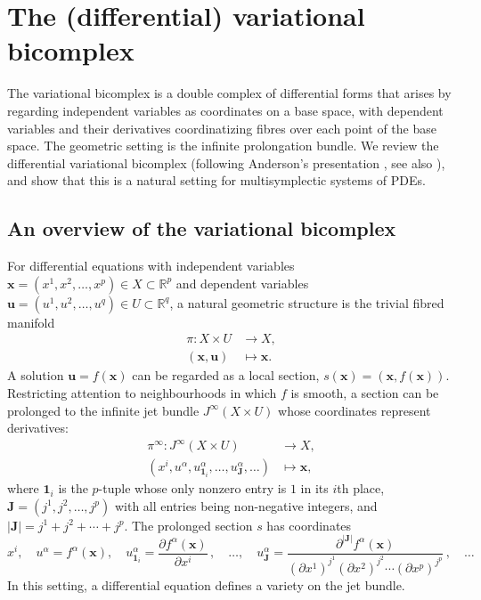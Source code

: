 \documentclass[11pt]{article} %
\numberwithin{equation}{section}
\newcommand{\mbu}{\mathbf{u}}
\newcommand{\mbx}{\mathbf{x}}
\newcommand{\mbJ}{\mathbf{J}}
\theoremstyle{plain}
\theoremstyle{definition}
\begin{document}
\section{The (differential) variational bicomplex}
\label{sec:vb}
The variational bicomplex is a double complex of differential forms that arises by regarding independent variables as coordinates on a base space, with dependent variables and their derivatives coordinatizing fibres over each point of the base space. The geometric setting is the infinite prolongation bundle. We review the differential variational bicomplex (following Anderson's presentation \cite{An1992,An1989}, see also \cite{Ts1982,KrVi1999,Vi1984}), and show that this is a natural setting for multisymplectic systems of PDEs. 

\subsection{An overview of the variational bicomplex}
For differential equations with independent variables $\mbx=(x^1,x^2,\ldots,x^p)\in X\subset \mathbb{R}^p$ and dependent variables $\mbu=(u^1,u^2,\ldots, u^q)\in U\subset \mathbb{R}^q$, a natural geometric structure is the trivial fibred manifold 
\begin{equation}
\begin{aligned}
\pi: X\times U&\rightarrow X,\\
(\mbx,\mbu)&\mapsto \mbx.
\end{aligned}
\end{equation}
A solution $\mbu=f(\mbx)$ can be regarded as a local section, $s(\mbx)=(\mbx,f(\mbx))$. Restricting attention to neighbourhoods in which $f$ is smooth, a section can be prolonged to the infinite jet bundle $J^{\infty}(X\times U)$ whose coordinates represent derivatives:
\begin{equation}
\begin{aligned}
\pi^{\infty}: J^{\infty}(X\times U)&\rightarrow X,\\
(x^i,u^{\alpha},u_{\mathbf{1}_i}^{\alpha},\ldots,u^{\alpha}_{\mbJ},\ldots)&\mapsto \mbx,
\end{aligned}
\end{equation}
where $\mathbf{1}_i$ is the $p$-tuple whose only nonzero entry is $1$ in its $i$th place, $\mbJ=(j^1,j^2,\ldots,j^p)$ with all entries being non-negative integers, and $|\mbJ|=j^1+j^2+\cdots+j^p$.
The prolonged section $s$ has coordinates 
\begin{equation}
x^i,\quad u^\alpha=f^\alpha(\mbx),\quad u_{\mathbf{1}_i}^{\alpha}=\frac{\partial f^{\alpha}(\mbx)}{\partial x^i}\,,\quad \ldots,\quad u^{\alpha}_{\mbJ}=\frac{\partial^{|\mbJ|}f^{\alpha}(\mbx)}{(\partial x^1)^{j^1}(\partial x^2)^{j^2}\cdots  (\partial x^p)^{j^p}}\,, \quad \ldots 
\end{equation}
 In this setting, a differential equation defines a variety on the jet bundle.
\end{document}
